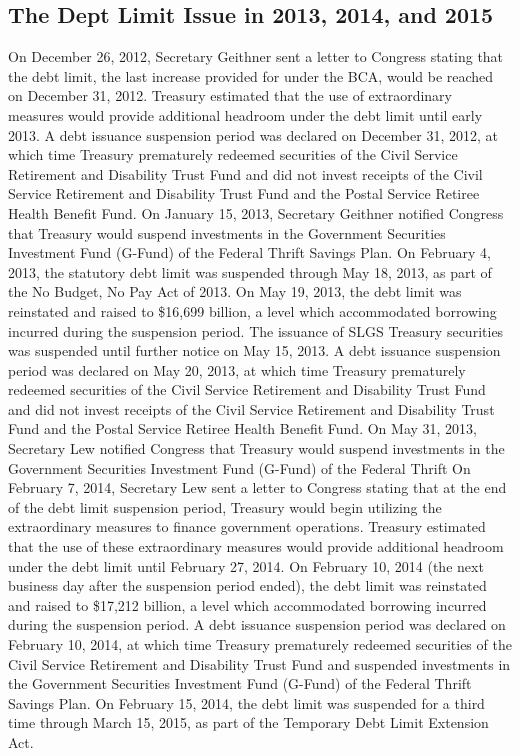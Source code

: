 \subsection{The Dept Limit Issue in 2013, 2014, and 2015}
On December 26, 2012, Secretary Geithner sent a letter to Congress stating that the debt limit, the last increase provided for under the BCA, would be reached on December 31, 2012. Treasury estimated that the use of extraordinary measures would provide additional headroom under the debt limit until early 2013. A debt issuance suspension period was declared on December 31, 2012, at which time Treasury prematurely redeemed securities of the Civil Service Retirement and Disability Trust Fund and did not invest receipts of the Civil Service Retirement and Disability Trust Fund and the Postal Service Retiree Health Benefit Fund. On January 15, 2013, Secretary Geithner notified Congress that Treasury would suspend investments in the Government Securities Investment Fund (G-Fund) of the Federal Thrift Savings Plan. On February 4, 2013, the statutory debt limit was suspended through May 18, 2013, as part of the No Budget, No Pay Act of 2013.
\newline
On May 19, 2013, the debt limit was reinstated and raised to \$16,699 billion, a level which accommodated borrowing incurred during the suspension period. The issuance of SLGS Treasury securities was suspended until further notice on May 15, 2013. A debt issuance suspension period was declared on May 20, 2013, at which time Treasury prematurely redeemed securities of the Civil Service Retirement and Disability Trust Fund and did not invest receipts of the Civil Service Retirement and Disability Trust Fund and the Postal Service Retiree Health Benefit Fund. On May 31, 2013, Secretary Lew notified Congress that Treasury would suspend investments in the Government Securities Investment Fund (G-Fund) of the Federal Thrift
\newline \newline
On February 7, 2014, Secretary Lew sent a letter to Congress stating that at the end of the debt limit suspension period, Treasury would begin utilizing the extraordinary measures to finance government operations. Treasury estimated that the use of these extraordinary measures would provide additional headroom under the debt limit until February 27, 2014. On February 10, 2014 (the next business day after the suspension period ended), the debt limit was reinstated and raised to \$17,212 billion, a level which accommodated borrowing incurred during the suspension period. A debt issuance suspension period was declared on February 10, 2014, at which time Treasury prematurely redeemed securities of the Civil Service Retirement and Disability Trust Fund and suspended investments in the Government Securities Investment Fund (G-Fund) of the Federal Thrift Savings Plan. On February 15, 2014, the debt limit was suspended for a third time through March 15, 2015, as part of the Temporary Debt Limit Extension Act.

